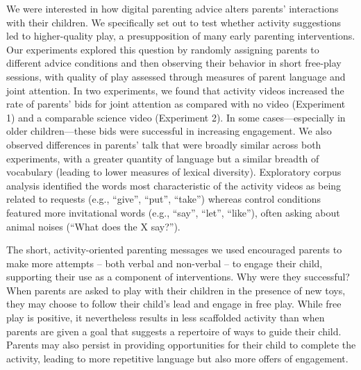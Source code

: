 \documentclass[man,floatsintext]{apa6}
\begin{document}
We were interested in how digital parenting advice alters parents' interactions with their children.
We specifically set out to test whether activity suggestions led to higher-quality play, a presupposition of many early parenting interventions.
Our experiments explored this question by randomly assigning parents to different advice conditions and then observing their behavior in short free-play sessions, with quality of play assessed through measures of parent language and joint attention.
In two experiments, we found that activity videos increased the rate of parents' bids for joint attention as compared with no video (Experiment 1) and a comparable science video (Experiment 2).
In some cases---especially in older children---these bids were successful in increasing engagement.
We also observed differences in parents' talk that were broadly similar across both experiments, with a greater quantity of language but a similar breadth of vocabulary (leading to lower measures of lexical diversity).
Exploratory corpus analysis identified the words most characteristic of the activity videos as being related to requests (e.g., \enquote{give}, \enquote{put}, \enquote{take}) whereas control conditions featured more invitational words (e.g., \enquote{say}, \enquote{let}, \enquote{like}), often asking about animal noises (\enquote{What does the X say?}).

The short, activity-oriented parenting messages we used encouraged parents to make more attempts -- both verbal and non-verbal -- to engage their child, supporting their use as a component of interventions.
Why were they successful?
When parents are asked to play with their children in the presence of new toys, they may choose to follow their child's lead and engage in free play.
While free play is positive, it nevertheless results in less scaffolded activity than when parents are given a goal that suggests a repertoire of ways to guide their child.
Parents may also persist in providing opportunities for their child to complete the activity, leading to more repetitive language but also more offers of engagement.
\end{document}
